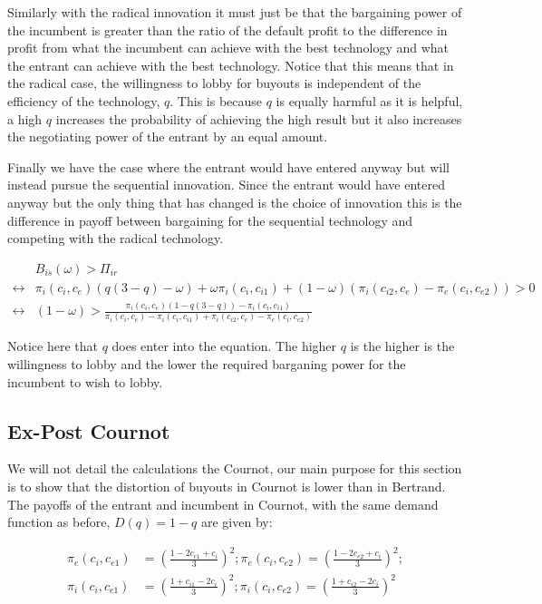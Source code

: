 Similarly with the radical innovation it must just be that the bargaining power of the incumbent is greater than the ratio of the default profit to the difference in profit from what the incumbent can achieve with the best technology and what the entrant can achieve with the best technology. Notice that this means that in the radical case, the willingness to lobby for buyouts is independent of the efficiency of the technology, $q$. This is because $q$ is equally harmful as it is helpful, a high $q$ increases the probability of achieving the high result but it also increases the negotiating power of the entrant by an equal amount. 

Finally we have the case where the entrant would have entered anyway but will instead pursue the sequential innovation. Since the entrant would have entered anyway but the only thing that has changed is the choice of innovation this is the difference in payoff between bargaining for the sequential technology and competing with the radical technology. 

\begin{align*}
&B_{is}(\omega)>\Pi_{ir} \\
\leftrightarrow &\pi_i(c_i,c_e)(q(3-q) -\omega) 
+\omega \pi_i(c_i,c_{i1}) 
 +(1-\omega)(\pi_i(c_{i2},c_e)-\pi_e(c_{i},c_{e2})) 
> 0 \\
\leftrightarrow &
(1-\omega)> \frac{\pi_i(c_i,c_e)(1-q(3-q))-\pi_i(c_i,c_{i1})}{\pi_i(c_i,c_e)-\pi_i(c_i,c_{i1})+\pi_i(c_{i2},c_e)-\pi_e(c_{i},c_{e2})}  
\end{align*}

Notice here that $q$ does enter into the equation. The higher $q$ is the higher is the willingness to lobby and the lower the required barganing power for the incumbent to wish to lobby. 

\subsection{Ex-Post Cournot}

We will not detail the calculations the Cournot, our main purpose for this section is to show that the distortion of buyouts in Cournot is lower than in Bertrand. The payoffs of the entrant and incumbent in Cournot, with the same demand function as before, $D(q)=1-q$ are given by:

\begin{align*}
\pi_{e}(c_i,c_{e1}) &= \left(\frac{1-2 c_{e1}+c_{i}}{3}  \right)^2;
\pi_{e}(c_i,c_{e2}) = \left(\frac{1-2 c_{e2}+c_{i}}{3}  \right)^2; \\
\pi_{i}(c_i,c_{e1}) &= \left(\frac{1+ c_{i1}-2c_{i}}{3}  \right)^2;
\pi_{i}(c_i,c_{e2}) = \left(\frac{1+ c_{i2}-2c_{i}}{3}  \right)^2 \\
\end{align*}


